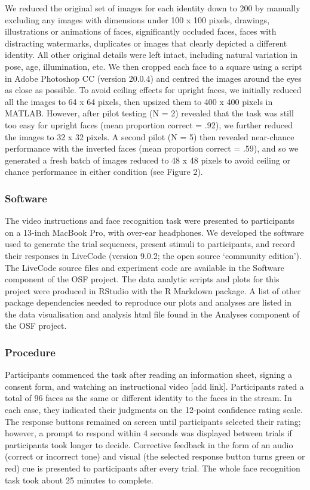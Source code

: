 \documentclass[
  english,
  man]{apa6}
\begin{document}
We reduced the original set of images for each identity down to 200 by manually excluding any images with dimensions under 100 x 100 pixels, drawings, illustrations or animations of faces, significantly occluded faces, faces with distracting watermarks, duplicates or images that clearly depicted a different identity. All other original details were left intact, including natural variation in pose, age, illumination, etc. We then cropped each face to a square using a script in Adobe Photoshop CC (version 20.0.4) and centred the images around the eyes as close as possible. To avoid ceiling effects for upright faces, we initially reduced all the images to 64 x 64 pixels, then upsized them to 400 x 400 pixels in MATLAB. However, after pilot testing (N = 2) revealed that the task was still too easy for upright faces (mean proportion correct = .92), we further reduced the images to 32 x 32 pixels. A second pilot (N = 5) then revealed near-chance performance with the inverted faces (mean proportion correct = .59), and so we generated a fresh batch of images reduced to 48 x 48 pixels to avoid ceiling or chance performance in either condition (see Figure 2).

\hypertarget{software}{%
\subsubsection{Software}\label{software}}

The video instructions and face recognition task were presented to participants on a 13-inch MacBook Pro, with over-ear headphones. We developed the software used to generate the trial sequences, present stimuli to participants, and record their responses in LiveCode (version 9.0.2; the open source `community edition'). The LiveCode source files and experiment code are available in the Software component of the OSF project. The data analytic scripts and plots for this project were produced in RStudio with the R Markdown package. A list of other package dependencies needed to reproduce our plots and analyses are listed in the data visualisation and analysis html file found in the Analyses component of the OSF project.

\hypertarget{procedure}{%
\subsubsection{Procedure}\label{procedure}}

Participants commenced the task after reading an information sheet, signing a consent form, and watching an instructional video {[}add link{]}. Participants rated a total of 96 faces as the same or different identity to the faces in the stream. In each case, they indicated their judgments on the 12-point confidence rating scale. The response buttons remained on screen until participants selected their rating; however, a prompt to respond within 4 seconds was displayed between trials if participants took longer to decide. Corrective feedback in the form of an audio (correct or incorrect tone) and visual (the selected response button turns green or red) cue is presented to participants after every trial. The whole face recognition task took about 25 minutes to complete.
\end{document}
